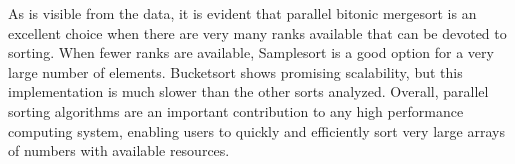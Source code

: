 \documentclass[10pt,letterpaper]{article}
\begin{document}
\begin{multicols}{2}
As is visible from the data, it is evident that parallel bitonic mergesort is an excellent choice when there are very many ranks available that can be devoted to sorting. When fewer ranks are available, Samplesort is a good option for a very large number of elements. Bucketsort shows promising scalability, but this implementation is much slower than the other sorts analyzed. Overall, parallel sorting algorithms are an important contribution to any high performance computing system, enabling users to quickly and efficiently sort very large arrays of numbers with available resources.




\end{multicols}
\end{document}
